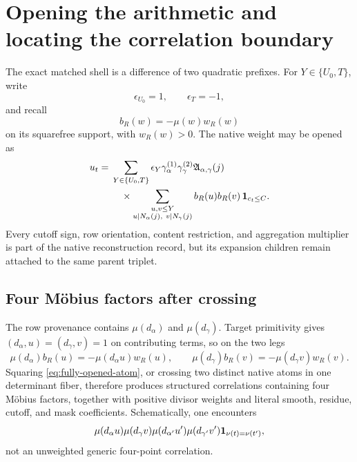 \section{Opening the arithmetic and locating the correlation boundary}
\label{sec:opened-arithmetic}

The exact matched shell is a difference of two quadratic prefixes.
For \(Y\in\{U_0,T\}\), write
\[
 \epsilon_{U_0}=1,\qquad \epsilon_T=-1,
\]
and recall
\[
 b_R(w)=-\mu(w)w_R(w)
\]
on its squarefree support, with \(w_R(w)>0\).  The native weight may
be opened as
\begin{equation}
\begin{split}
 u_t={}&
 \sum_{Y\in\{U_0,T\}}\epsilon_Y
 \gamma_\alpha^{(1)}\gamma_\gamma^{(2)}
 \mathfrak A_{\alpha,\gamma}(j)\\
 &\quad\times
 \sum_{\substack{u,v\le Y\\
 u\mid N_\alpha(j),\ v\mid N_\gamma(j)}}
 b_R(u)b_R(v)\,
 \mathbf 1_{c_t\le C}.
\end{split}
\label{eq:fully-opened-atom}
\end{equation}
Every cutoff sign, row orientation, content restriction, and
aggregation multiplier is part of the native reconstruction record,
but its expansion children remain attached to the same parent
triplet.

\subsection{Four M\"obius factors after crossing}

The row provenance contains \(\mu(d_\alpha)\) and
\(\mu(d_\gamma)\).  Target primitivity gives
\((d_\alpha,u)=(d_\gamma,v)=1\) on contributing terms, so on the two
legs
\begin{equation}
 \mu(d_\alpha)b_R(u)
 =-\mu(d_\alpha u)w_R(u),\qquad
 \mu(d_\gamma)b_R(v)
 =-\mu(d_\gamma v)w_R(v).
\label{eq:sign-fusion}
\end{equation}
Squaring \eqref{eq:fully-opened-atom}, or crossing two distinct native
atoms in one determinant fiber, therefore produces structured
correlations containing four M\"obius factors, together with positive
divisor weights and literal smooth, residue, cutoff, and mask
coefficients.  Schematically, one encounters
\begin{equation}
 \mu(d_\alpha u)\mu(d_\gamma v)
 \mu(d_{\alpha'}u')\mu(d_{\gamma'}v')
 \mathbf 1_{\nu(t)=\nu(t')},
\label{eq:four-mobius-schematic}
\end{equation}
not an unweighted generic four-point correlation.

